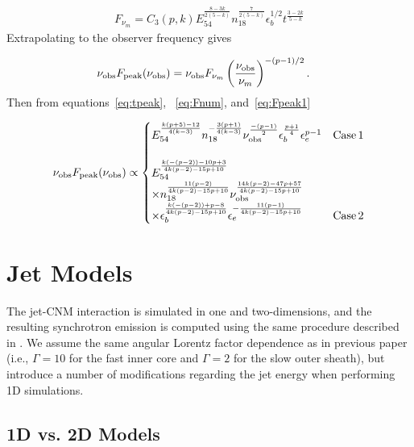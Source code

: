 \documentclass[usenatbib,fleqn]{mnras}
\begin{document}
\begin{align}
  F_{\nu_m} =  C_3(p, k) E_{54}^{\frac{8-3 k}{2 (5-k)}}
  n_{18}^{\frac{7}{2 (5-k)}} \epsilon_b^{1/2} t^{\frac{3-2 k}{5-k}}
\label{eq:Fnum}
\end{align}
%
Extrapolating to the observer frequency gives 

\begin{align}
  \nu_{\rm obs} F_{\rm peak} (\nu_{\rm obs}) &= \nu_{\rm obs}   F_{\nu_m}
  \left(\frac{\nu_{\rm obs}}{\nu_m}\right)^{-(p-1)/2}.
  \label{eq:Fpeak1}
\end{align}
%
Then from equations~\eqref{eq:tpeak}, ~\eqref{eq:Fnum},
and~\eqref{eq:Fpeak1}

\begin{align}
  \nu_{\rm obs} F_{\rm peak} (\nu_{\rm obs}) \propto
  \begin{cases}
    E_{54}^{\frac{k (p+5)-12}{4 (k-3)}} n_{18}^{-\frac{3 (p+1)}{4
        (k-3)}} \nu_{\rm obs}^{\frac{-(p-1)}{2}}
    \epsilon_b^{\frac{p+1}{4}} \epsilon_e^{p-1} & {\rm Case \,
      1}\\\\
    E_{54}^{\frac{k(-(p-2))-10 p+3}{4 k (p-2)-15 p+10}} \\ \times
    n_{18}^{\frac{11 (p-2)}{4 k (p-2)-15 p+10}} \nu_{\rm
      obs}^{\frac{14 k (p-2)-47 p+57}{4 k (p-2)-15 p+10}} \\ \times
    \epsilon_b^{\frac{k (-(p-2))+p-8}{4 k(p-2)-15 p+10}}
    \epsilon_e^{-\frac{11 (p-1)}{4 k (p-2)-15p+10}} & {\rm Case \, 2}
  \end{cases}
\end{align}





\section{Jet Models}
\label{sec:numerical}

The jet-CNM interaction is simulated in one and two-dimensions, and
the resulting synchrotron emission is computed using the same
procedure described in \citet{Mimica+2015}. We assume the same angular
Lorentz factor dependence as in previous paper (i.e., $\Gamma = 10$
for the fast inner core and $\Gamma = 2$ for the slow outer sheath),
but introduce a number of modifications regarding the jet energy
when performing 1D simulations.

\subsection{1D vs. 2D Models}
\label{sec:2D}
\end{document}
